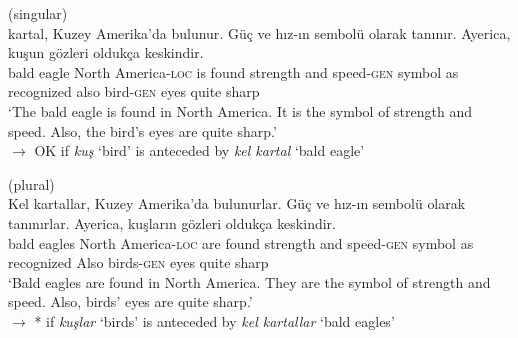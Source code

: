 \documentclass[output=paper,
modfonts
]{langscibook}
\begin{document}
	\ea \label{ex:despic:50}
	 (singular) \\
	 {kartal}, {Kuzey} {Amerika'da} {bulunur}. {G\"u\c c} {ve} {h\i z-\i n}{ sembol\"u} {olarak} {tan\i n\i r}. {Ayerica}, {ku\c sun} {g\"ozleri} {olduk\c ca} {keskindir}. \\
	bald eagle North America-\textsc{loc} {is found} strength and speed-\textsc{gen} symbol as recognized also bird-\textsc{gen} eyes quite sharp \\
	\glt `The bald eagle is found in North America. It is the symbol of strength and speed. Also, the bird's eyes are quite sharp.' \\
	$\rightarrow$ OK if \textit{ku\c s} `bird' is anteceded by \textit{kel kartal} `bald eagle'
	\z \newpage 
	
	\ea \label{ex:despic:51}
	 (plural) \\
	\gll 
	{Kel} {kartallar}, {Kuzey} {Amerika'da} {bulunurlar}. {G\"u\c c} {ve} {h\i z-\i n} {sembol\"u} {olarak} {tan\i n\i rlar.} {Ayerica}, {ku\c slar\i n} {g\"ozleri} {olduk\c ca} {keskindir}. \\
	bald eagles North America-\textsc{loc} {are found} strength and speed-\textsc{gen} symbol as recognized Also birds-\textsc{gen} eyes quite sharp \\
	\glt `Bald eagles are found in North America. They are the symbol of strength and speed. Also, birds' eyes are quite sharp.' \\
	$\rightarrow$ * if \textit{ku\c slar} `birds' is anteceded by \textit{kel kartallar} `bald eagles'
	\z 
	
\end{document}

